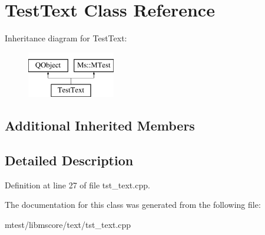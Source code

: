 \hypertarget{class_test_text}{}\section{Test\+Text Class Reference}
\label{class_test_text}
Inheritance diagram for Test\+Text\+:\begin{figure}[H]
\begin{center}
\leavevmode
\includegraphics[height=2.000000cm]{class_test_text}
\end{center}
\end{figure}
\subsection*{Additional Inherited Members}


\subsection{Detailed Description}


Definition at line 27 of file tst\+\_\+text.\+cpp.



The documentation for this class was generated from the following file\+:\begin{DoxyCompactItemize}
\item 
mtest/libmscore/text/tst\+\_\+text.\+cpp\end{DoxyCompactItemize}
